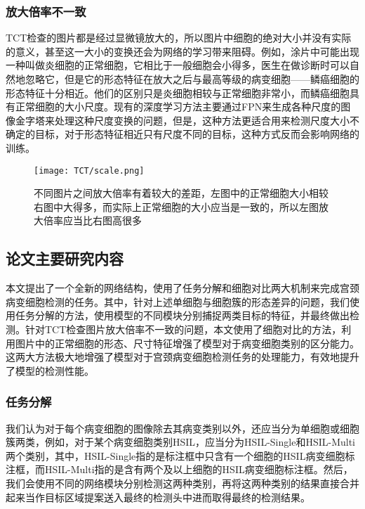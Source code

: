 \subsubsection{放大倍率不一致}
\par TCT检查的图片都是经过显微镜放大的，所以图片中细胞的绝对大小并没有实际的意义，甚至这一大小的变换还会为网络的学习带来阻碍。例如，涂片中可能出现一种叫做炎细胞的正常细胞，它相比于一般细胞会小得多，医生在做诊断时可以自然地忽略它，但是它的形态特征在放大之后与最高等级的病变细胞——鳞癌细胞的形态特征十分相近。他们的区别只是炎细胞相较与正常细胞非常小，而鳞癌细胞具有正常细胞的大小尺度。现有的深度学习方法主要通过FPN来生成各种尺度的图像金字塔来处理这种尺度变换的问题，但是，这种方法更适合用来检测尺度大小不确定的目标，对于形态特征相近只有尺度不同的目标，这种方式反而会影响网络的训练。
\begin{figure}[h]
    \centering
    \texttt{[image: TCT/scale.png]}
    \caption{不同图片之间放大倍率有着较大的差距，左图中的正常细胞大小相较右图中大得多，而实际上正常细胞的大小应当是一致的，所以左图放大倍率应当比右图高很多}
    \label{论文倍率差异}
\end{figure}

\subsection{论文主要研究内容}
\par 本文提出了一个全新的网络结构，使用了任务分解和细胞对比两大机制来完成宫颈病变细胞检测的任务。其中，针对上述单细胞与细胞簇的形态差异的问题，我们使用任务分解的方法，使用模型的不同模块分别捕捉两类目标的特征，并最终做出检测。针对TCT检查图片放大倍率不一致的问题，本文使用了细胞对比的方法，利用图片中的正常细胞的形态、尺寸特征增强了模型对于病变细胞类别的区分能力。这两大方法极大地增强了模型对于宫颈病变细胞检测任务的处理能力，有效地提升了模型的检测性能。

\subsubsection{任务分解}
\par 我们认为对于每个病变细胞的图像除去其病变类别以外，还应当分为单细胞或细胞簇两类，例如，对于某个病变细胞类别HSIL，应当分为HSIL-Single和HSIL-Multi两个类别，其中，HSIL-Single指的是标注框中只含有一个细胞的HSIL病变细胞标注框，而HSIL-Multi指的是含有两个及以上细胞的HSIL病变细胞标注框。然后，我们会使用不同的网络模块分别检测这两种类别，再将这两种类别的结果直接合并起来当作目标区域提案送入最终的检测头中进而取得最终的检测结果。

